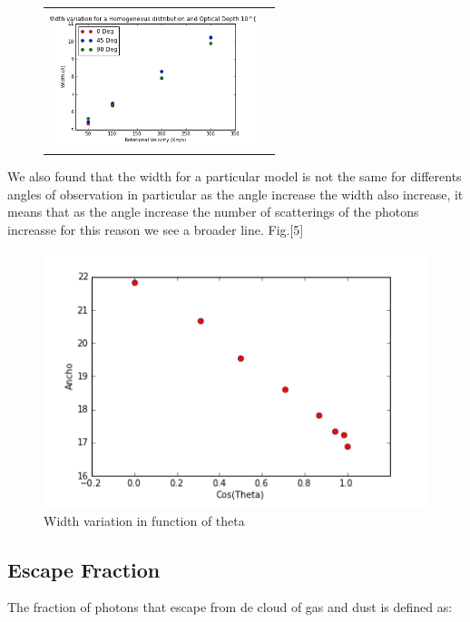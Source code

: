 \documentclass{article}
\theoremstyle{definition}
\theoremstyle{remark}
\begin{document}
\begin{figure}[H]
\begin{tabular}{cc}
    \includegraphics[width=60mm]{Width5HOM.png}\\

  \end{tabular}

\end{figure}

We also found that the width for a particular model is not the same
for differents angles of observation in particular as the angle
increase the width also increase, it means that as the angle increase
the number of scatterings of the photons increasse for this reason we
see a broader line. Fig.[5]\\ 

\begin{figure}[H]
\begin{center}
\includegraphics[scale=0.45]{WidthvsTheta.png}
\caption{Width variation in function of theta}
\end{center}
\end{figure}




\subsection*{Escape Fraction}

The fraction of photons that escape from de cloud of gas and dust is
defined as:\\ 
\end{document}
